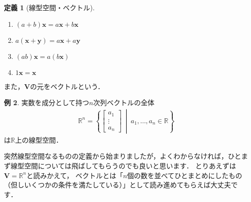 \documentclass[dvipdfmx]{jsarticle}
\theoremstyle{definition}
\newtheorem{definition}{定義}[section]
\newtheorem{example}[definition]{例}
\begin{document}
\begin{definition}[線型空間・ベクトル]
\begin{description}
\begin{enumerate}
                \item $(a + b) \bm{x} = a \bm{x} + b \bm{x}$
                    \label{vs_dist_vec}
                \item $a(\bm{x} + \bm{y}) = a \bm{x} + a \bm{y}$
                    \label{vs_dist_coef}
                \item $(ab) \bm{x} = a (b \bm{x})$
                    \label{vs_ass_coef}
                \item $1 \bm{x} = \bm{x}$
                    \label{vs_one}
            \end{enumerate}
    \end{description}
    また，$\bm{V}$の元をベクトルという．
\end{definition}
\begin{example}
    \label{vs_ex_rn}
    実数を成分として持つ$n$次列ベクトルの全体
    \begin{align*}
        \mathbb{R}^n = \left\{ \begin{bmatrix} a_1 \\ \vdots \\ a_n \end{bmatrix} \ \middle| \ a_1, \ldots, a_n \in \mathbb{R} \right\}
    \end{align*}
    は$\mathbb{R}$上の線型空間．
\end{example}
突然線型空間なるものの定義から始まりましたが，よくわからなければ，ひとまず線型空間については飛ばしてもらうのでも良いと思います．
とりあえずは$\bm{V} = \mathbb{R}^n$と読みかえて，
ベクトルとは「$n$個の数を並べてひとまとめにしたもの（但しいくつかの条件を満たしている）」として読み進めてもらえば大丈夫です．
\end{document}
